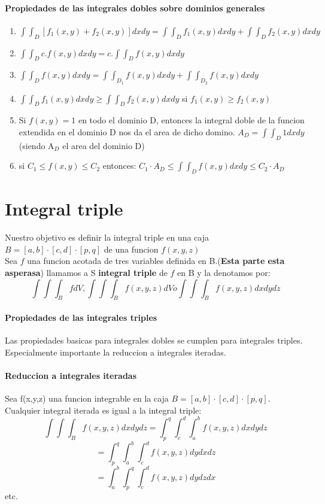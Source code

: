 \documentclass[11pt]{article}
\begin{document}
\paragraph{Propiedades de las integrales dobles sobre dominios generales}
\begin{enumerate}
	\item $\int \int_D [f_1 (x,y) + f_2(x,y)]dxdy = \int \int_D f_1(x,y)dxdy + \int \int_D f_2(x,y)dxdy$
	\item $\int \int_D c.f(x,y)dxdy =  c. \int \int_D f(x,y)dxdy$
	\item $\int \int_D f(x,y)dxdy = \int \int_{D_1} f(x,y)dxdy + \int \int_{D_2} f(x,y)dxdy$
	\item $\int \int_D f_1(x,y)dxdy \geq \int \int_D f_2(x,y)dxdy$ si $f_1(x,y) \geq f_2(x,y)$
	\item Si $f(x,y) = 1$ en todo el dominio D, entonces la integral doble de la funcion extendida en el dominio D nos da el area de dicho domino.
	$A_D = \int \int_D 1dxdy$ (siendo A$_D$ el area del dominio D)
	\item si $C_1 \leq f(x,y) \leq C_2$ entonces:
	$C_1 \cdot A_D \leq \int \int_D f(x,y)dxdy \leq C_2 \cdot A_D$
\end{enumerate}
\section{Integral triple}
Nuestro objetivo es definir la integral triple en una caja $B = [a,b]\cdot[c,d]\cdot[p,q]$ de una funcion $f(x,y,z)$\\
\linebreak
Sea $f$ una funcion acotada de tres variables definida en B.(\textbf{Esta parte esta asperasa}) llamamos a S \textbf{integral triple} de $f$ en B y la denotamos por:
\begin{equation*}
	\int \int \int_B f dV, \int \int \int_B f(x,y,z)dV o \int\int\int_B f(x,y,z) dxdydz
\end{equation*}
\paragraph{Propiedades de las integrales triples}
Las propiedades basicas para integrales dobles se cumplen para integrales triples. Especialmente importante la reduccion a integrales iteradas.
\paragraph{Reduccion a integrales iteradas} Sea f(x,y,z) una funcion integrable en la caja $B = [a,b]\cdot[c,d]\cdot[p,q]$. Cualquier integral iterada es igual a la integral triple:
\begin{equation*}
	\int \int \int_B f(x,y,z)dxdydz = \int_p^q \int_c^d \int_a^b f(x,y,z)dxdydz
\end{equation*}
\begin{equation*}
	= \int_p^q \int_a^b \int_c^d f(x,y,z)dydxdz
\end{equation*}
\begin{equation*}
	= \int_a^b \int_p^q \int_c^d f(x,y,z)dydzdx
\end{equation*}
etc.
\end{document}
